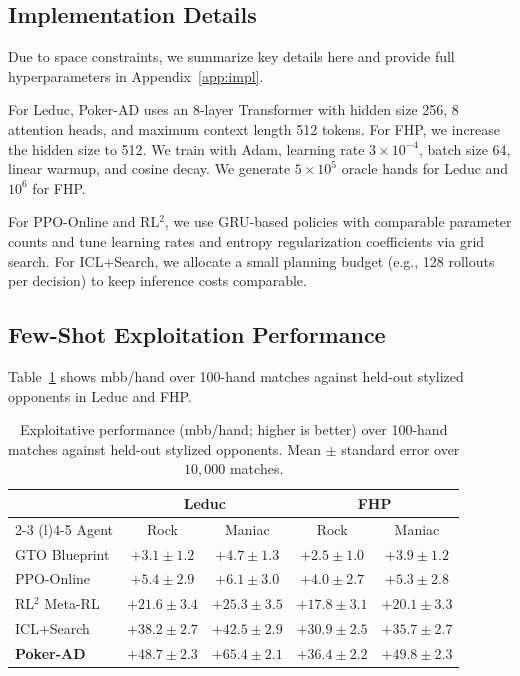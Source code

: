 \documentclass{article}
\begin{document}
\subsection{Implementation Details}
\label{sec:impl}

Due to space constraints, we summarize key details here and provide full hyperparameters in Appendix~\ref{app:impl}.

For Leduc, Poker-AD uses an 8-layer Transformer with hidden size 256, 8 attention heads, and maximum context length 512 tokens. For FHP, we increase the hidden size to 512. We train with Adam, learning rate $3 \times 10^{-4}$, batch size 64, linear warmup, and cosine decay. We generate $5 \times 10^{5}$ oracle hands for Leduc and $10^{6}$ for FHP.

For PPO-Online and RL$^2$, we use GRU-based policies with comparable parameter counts and tune learning rates and entropy regularization coefficients via grid search. For ICL+Search, we allocate a small planning budget (e.g., 128 rollouts per decision) to keep inference costs comparable.

\subsection{Few-Shot Exploitation Performance}
\label{sec:fewshot}

Table~\ref{tab:main_results} shows mbb/hand over 100-hand matches against held-out stylized opponents in Leduc and FHP.

\begin{table}[t]
    \centering
    \caption{Exploitative performance (mbb/hand; higher is better) over 100-hand matches against held-out stylized opponents. Mean $\pm$ standard error over $10{,}000$ matches.}
    \label{tab:main_results}
    \begin{tabular}{lcccc}
        \toprule
        & \multicolumn{2}{c}{Leduc} & \multicolumn{2}{c}{FHP} \\
        \cmidrule(r){2-3} \cmidrule(l){4-5}
        Agent & Rock & Maniac & Rock & Maniac \\
        \midrule
        GTO Blueprint & $+3.1 \pm 1.2$ & $+4.7 \pm 1.3$ & $+2.5 \pm 1.0$ & $+3.9 \pm 1.2$ \\
        PPO-Online    & $+5.4 \pm 2.9$ & $+6.1 \pm 3.0$ & $+4.0 \pm 2.7$ & $+5.3 \pm 2.8$ \\
        RL$^2$ Meta-RL & $+21.6 \pm 3.4$ & $+25.3 \pm 3.5$ & $+17.8 \pm 3.1$ & $+20.1 \pm 3.3$ \\
        ICL+Search    & $+38.2 \pm 2.7$ & $+42.5 \pm 2.9$ & $+30.9 \pm 2.5$ & $+35.7 \pm 2.7$ \\
        \textbf{Poker-AD} & $\mathbf{+48.7 \pm 2.3}$ & $\mathbf{+65.4 \pm 2.1}$ & $\mathbf{+36.4 \pm 2.2}$ & $\mathbf{+49.8 \pm 2.3}$ \\
        \bottomrule
    \end{tabular}
\end{table}
\end{document}
